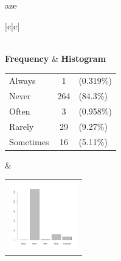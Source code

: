  aze 
  \begin{center}
    \addtolength{\leftskip}{-4cm}\addtolength{\rightskip}{-4cm}
    \begin{tabular}{|c|c|}

      \hline
        \\
      \hline
        {\bf Frequency} & {\bf Histogram}  \\
          \begin{tabular}{@{}l@{ : }cl@{}}
            Always & 1 &(0.319\%) \\
            Never & 264 &(84.3\%) \\
            Often & 3 &(0.958\%) \\
            Rarely & 29 &(9.27\%) \\
            Sometimes & 16 &(5.11\%) \\
          \end{tabular}
      &
          \begin{tabular}{@{}l@{}}
            \includegraphics[width=3cm]{graphUniv/V15-barplot}
          \end{tabular}
      \\ \hline 

    \end{tabular}
  \end{center}
  
  




